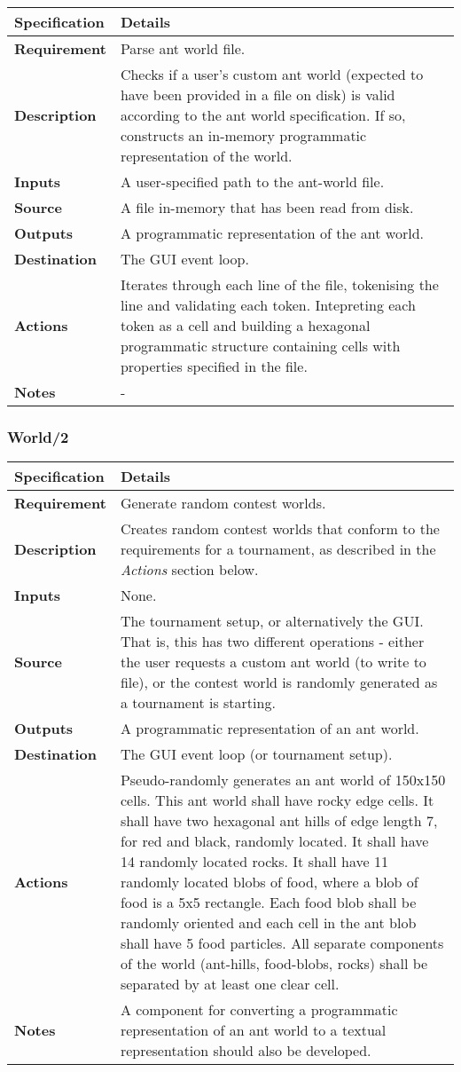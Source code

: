 \documentclass[11pt]{article}
\begin{document}
\begin{longtable}[c]{@{\extracolsep{\fill}}|p{}|p{}|@{}}
\hline
Specification & Details\tabularnewline
\hline

\textbf{Requirement} & Parse ant world file.\tabularnewline
\textbf{Description} & Checks if a user's custom ant world (expected to
have been provided in a file on disk) is valid according to the ant
world specification. If so, constructs an in-memory programmatic
representation of the world.\tabularnewline
\textbf{Inputs} & A user-specified path to the ant-world
file.\tabularnewline
\textbf{Source} & A file in-memory that has been read from
disk.\tabularnewline
\textbf{Outputs} & A programmatic representation of the ant
world.\tabularnewline
\textbf{Destination} & The GUI event loop.\tabularnewline
\textbf{Actions} & Iterates through each line of the file, tokenising
the line and validating each token. Intepreting each token as a cell and
building a hexagonal programmatic structure containing cells with
properties specified in the file.\tabularnewline
\textbf{Notes} & -\tabularnewline
\hline
\end{longtable}

\subsubsection*{World/2}\label{world2}

\begin{longtable}[c]{@{\extracolsep{\fill}}|p{}|p{}|@{}}
\hline
Specification & Details\tabularnewline
\hline

\textbf{Requirement} & Generate random contest worlds.\tabularnewline
\textbf{Description} & Creates random contest worlds that conform to the
requirements for a tournament, as described in the \emph{Actions}
section below.\tabularnewline
\textbf{Inputs} & None.\tabularnewline
\textbf{Source} & The tournament setup, or alternatively the GUI. That
is, this has two different operations - either the user requests a
custom ant world (to write to file), or the contest world is randomly
generated as a tournament is starting.\tabularnewline
\textbf{Outputs} & A programmatic representation of an ant
world.\tabularnewline
\textbf{Destination} & The GUI event loop (or tournament
setup).\tabularnewline
\textbf{Actions} & Pseudo-randomly generates an ant world of 150x150
cells. This ant world shall have rocky edge cells. It shall have two
hexagonal ant hills of edge length 7, for red and black, randomly
located. It shall have 14 randomly located rocks. It shall have 11
randomly located blobs of food, where a blob of food is a 5x5 rectangle.
Each food blob shall be randomly oriented and each cell in the ant blob
shall have 5 food particles. All separate components of the world
(ant-hills, food-blobs, rocks) shall be separated by at least one clear
cell.\tabularnewline
\textbf{Notes} & A component for converting a programmatic
representation of an ant world to a textual representation should also
be developed.\tabularnewline
\hline
\end{longtable}
\end{document}
